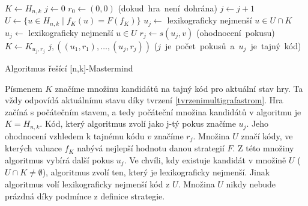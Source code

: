 






\begin{algorithm}[h!]
\begin{algorithmic}[1]  %
    \State $K \gets H_{n,k}$ 
    \State $j \gets 0$
    \State $r_0 \gets (0,0)$
     \hfill \mbox{(dokud hra není dohrána)}
        \State $j \gets j + 1$ 
	\State $U \gets \{u \in H_{n,k} \mid f_K(u) = F(f_K)\}$
            \State $u_j \gets$ lexikograficky nejmenší $u \in U \cap K$
	\Else
		\State $u_j \gets$ lexikograficky nejmenší $u \in U$
	\EndIf
        \State $r_j \gets s(u_j, v)$ \hfill \mbox{(ohodnocení pokusu)}
        \State $K \gets K_{u_j,r_j}$
    \EndWhile
    \State \Return $j, ((u_1,r_1),\dots,(u_j, r_j))$ \hfill \mbox{($j$ je počet pokusů a $u_j$ je tajný kód)}
\EndFunction
\end{algorithmic}
\caption{Algoritmus řešící [n,k]-Mastermind}
\label{alg-default}
\end{algorithm}

Písmenem $K$ značíme množinu kandidátů na tajný kód pro aktuální stav hry. Ta vždy odpovídá aktuálnímu stavu díky tvrzení \ref{tvrzenimultigrafastrom}. Hra začíná s počátečním stavem, a tedy počáteční množina kandidátů v algoritmu je $K = H_{n,k}$. Kód, který algoritmus zvolí jako j-tý pokus značíme $u_j$. Jeho ohodnocení vzhledem k tajnému kódu $v$ značíme $r_j$. Množina $U$ značí kódy, ve kterých valuace $f_K$ nabývá nejlepší hodnotu danou strategií $F$. Z této množiny algoritmus vybírá další pokus $u_j$. Ve chvíli, kdy existuje kandidát v množině $U$ ($U\cap K \neq \emptyset$), algoritmus zvolí ten, který je lexikograficky nejmenší. Jinak algoritmus volí lexikograficky nejmenší kód z $U$. Množina $U$ nikdy nebude prázdná díky podmínce z definice strategie. 

